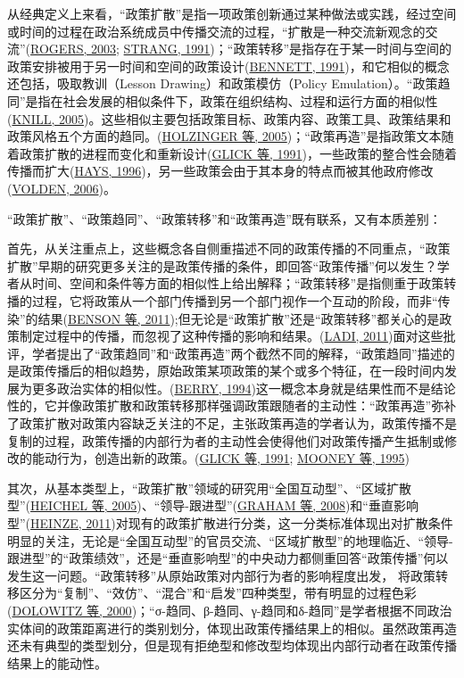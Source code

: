 \documentclass[
  12pt,
]{ctexart}
\begin{document}
从经典定义上来看，``政策扩散''是指一项政策创新通过某种做法或实践，经过空间或时间的过程在政治系统成员中传播交流的过程，``扩散是一种交流新观念的交流''(\protect\hyperlink{ref-Rogers2003}{ROGERS, 2003}; \protect\hyperlink{ref-STRANG1991}{STRANG, 1991})；``政策转移''是指存在于某一时间与空间的政策安排被用于另一时间和空间的政策设计(\protect\hyperlink{ref-Bennett1991}{BENNETT, 1991})，和它相似的概念还包括，吸取教训（Lesson Drawing）和政策模仿（Policy Emulation）。``政策趋同''是指在社会发展的相似条件下，政策在组织结构、过程和运行方面的相似性(\protect\hyperlink{ref-Knill2005}{KNILL, 2005})。这些相似主要包括政策目标、政策内容、政策工具、政策结果和政策风格五个方面的趋同。(\protect\hyperlink{ref-HolzingerKnill2005}{HOLZINGER 等, 2005})；``政策再造''是指政策文本随着政策扩散的进程而变化和重新设计(\protect\hyperlink{ref-GlickHays1991}{GLICK 等, 1991})，一些政策的整合性会随着传播而扩大(\protect\hyperlink{ref-Hays1996}{HAYS, 1996})，另一些政策会由于其本身的特点而被其他政府修改(\protect\hyperlink{ref-Volden2006}{VOLDEN, 2006})。

``政策扩散''、``政策趋同''、``政策转移''和``政策再造''既有联系，又有本质差别：

首先，从关注重点上，这些概念各自侧重描述不同的政策传播的不同重点，``政策扩散''早期的研究更多关注的是政策传播的条件，即回答``政策传播''何以发生？学者从时间、空间和条件等方面的相似性上给出解释；``政策转移''是指侧重于政策转播的过程，它将政策从一个部门传播到另一个部门视作一个互动的阶段，而非``传染''的结果(\protect\hyperlink{ref-BensonJordan2011}{BENSON 等, 2011});但无论是``政策扩散''还是``政策转移''都关心的是政策制定过程中的传播，而忽视了这种传播的影响和结果。(\protect\hyperlink{ref-Ladi2011}{LADI, 2011})面对这些批评，学者提出了``政策趋同''和``政策再造''两个截然不同的解释，``政策趋同''描述的是政策传播后的相似趋势，原始政策某项政策的某个或多个特征，在一段时间内发展为更多政治实体的相似性。(\protect\hyperlink{ref-Berry1994}{BERRY, 1994})这一概念本身就是结果性而不是结论性的，它并像政策扩散和政策转移那样强调政策跟随者的主动性：``政策再造''弥补了政策扩散对政策内容缺乏关注的不足，主张政策再造的学者认为，政策传播不是复制的过程，政策传播的内部行为者的主动性会使得他们对政策传播产生抵制或修改的能动行为，创造出新的政策。(\protect\hyperlink{ref-GlickHays1991}{GLICK 等, 1991}; \protect\hyperlink{ref-MooneyLee1995}{MOONEY 等, 1995})

其次，从基本类型上，``政策扩散''领域的研究用``全国互动型''、``区域扩散型''(\protect\hyperlink{ref-HeichelEtAl2005}{HEICHEL 等, 2005})、``领导-跟进型''(\protect\hyperlink{ref-GrahamEtAl2008}{GRAHAM 等, 2008})和``垂直影响型''(\protect\hyperlink{ref-Heinze2011}{HEINZE, 2011})对现有的政策扩散进行分类，这一分类标准体现出对扩散条件明显的关注，无论是``全国互动型''的官员交流、``区域扩散型''的地理临近、``领导-跟进型''的``政策绩效''，还是``垂直影响型''的中央动力都侧重回答``政策传播''何以发生这一问题。``政策转移''从原始政策对内部行为者的影响程度出发， 将政策转移区分为``复制''、``效仿''、``混合''和``启发''四种类型，带有明显的过程色彩(\protect\hyperlink{ref-DolowitzMarsh2000}{DOLOWITZ 等, 2000})；``σ-趋同、β-趋同、γ-趋同和δ-趋同''是学者根据不同政治实体间的政策距离进行的类别划分，体现出政策传播结果上的相似。虽然政策再造还未有典型的类型划分，但是现有拒绝型和修改型均体现出内部行动者在政策传播结果上的能动性。
\end{document}
